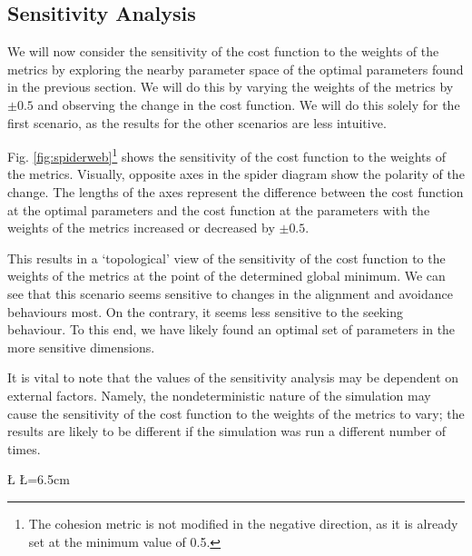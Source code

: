 \documentclass[12pt]{article}
\begin{document}

\subsection{Sensitivity Analysis}
We will now consider the sensitivity of the cost function to the weights of the metrics by exploring the nearby parameter space of the optimal parameters found in the previous section. We will do this by varying the weights of the metrics by $\pm 0.5$ and observing the change in the cost function. We will do this solely for the first scenario, as the results for the other scenarios are less intuitive.

Fig. \ref{fig:spiderweb}\footnote{The cohesion metric is not modified in the negative direction, as it is already set at the minimum value of 0.5.} shows the sensitivity of the cost function to the weights of the metrics. Visually, opposite axes in the spider diagram show the polarity of the change. The lengths of the axes represent the difference between the cost function at the optimal parameters and the cost function at the parameters with the weights of the metrics increased or decreased by $\pm 0.5$.

This results in a `topological' view of the sensitivity of the cost function to the weights of the metrics at the point of the determined global minimum. We can see that this scenario seems sensitive to changes in the alignment and avoidance behaviours most. On the contrary, it seems less sensitive to the seeking behaviour. To this end, we have likely found an optimal set of parameters in the more sensitive dimensions. 

It is vital to note that the values of the sensitivity analysis may be dependent on external factors. Namely, the nondeterministic nature of the simulation may cause the sensitivity of the cost function to the weights of the metrics to vary; the results are likely to be different if the simulation was run a different number of times.

\newcommand{\D}{10} %
\newcommand{\U}{13} %

\newdimen\R %
\R=6cm 
\newdimen\L %
\L=6.5cm

\newcommand{\A}{360/\D} %
\end{document}
